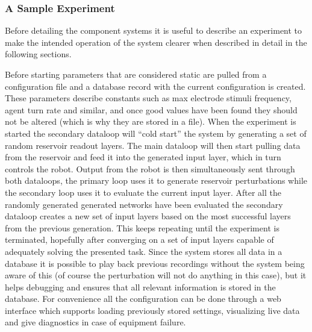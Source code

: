 \subsubsection{A Sample Experiment}
Before detailing the component systems it is useful to describe an experiment to
make the intended operation of the system clearer when described in detail in
the following sections.\par
Before starting parameters that are considered static are pulled from a
configuration file and a database record with the current configuration is
created.
These parameters describe constants such as max electrode stimuli frequency,
agent turn rate and similar, and once good values have been found they should
not be altered (which is why they are stored in a file).
When the experiment is started the secondary dataloop will ``cold start'' the
system by generating a set of random reservoir readout layers.
The main dataloop will then start pulling data from the reservoir and feed it
into the generated input layer, which in turn controls the robot.
Output from the robot is then simultaneously sent through both dataloops, the
primary loop uses it to generate reservoir perturbations while the secondary
loop uses it to evaluate the current input layer.
After all the randomly generated generated networks have been evaluated the
secondary dataloop creates a new set of input layers based on the most
successful layers from the previous generation.
This keeps repeating until the experiment is terminated, hopefully after
converging on a set of input layers capable of adequately solving the presented
task.
Since the system stores all data in a database it is possible to play back
previous recordings without the system being aware of this (of course the
perturbation will not do anything in this case), but it helps debugging and
ensures that all relevant information is stored in the database.
For convenience all the configuration can be done through a web interface which
supports loading previously stored settings, visualizing live data and give
diagnostics in case of equipment failure. 
